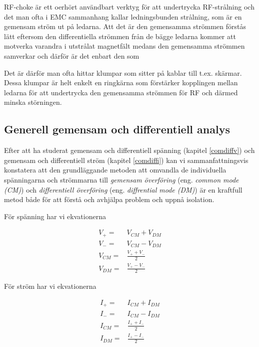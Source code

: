RF-choke är ett oerhört användbart verktyg för att undertrycka RF-strålning
och det man ofta i EMC sammanhang kallar ledningsbunden strålning, som är en
gemensam ström ut på ledarna. Att det är den gemensamma strömmen förstås lätt
eftersom den differentiella strömmen från de bägge ledarna kommer att motverka
varandra i utstrålat magnetfält medans den gemensamma strömmen samverkar och
därför är det enbart den som 

Det är därför man ofta hittar klumpar som sitter
på kablar till t.ex. skärmar. Dessa klumpar är helt enkelt en ringkärna som
förstärker kopplingen mellan ledarna för att undertrycka den gemensamma strömmen
för RF och därmed minska störningen.

\subsection{Generell gemensam och differentiell analys}
\label{comdiffgeneric}

Efter att ha studerat gemensam och differentiell spänning (kapitel \ref{comdiffv})
och gemensam och differentiell ström (kapitel \ref{comdiffi}) kan vi
sammanfattningsvis konstatera att den grundläggande metoden att omvandla
de individuella spänningarna och strömmarna till \emph{gemensam överföring}
(eng. \emph{common mode (CM)}) och \emph{differentiell överföring}
(eng. \emph{diffrential mode (DM)}) är en kraftfull metod både för att
förstå och avhjälpa problem och uppnå isolation.

För spänning har vi ekvationerna

\begin{eqnarray}
V_+ = & V_{CM} + V_{DM}\\
V_- = & V_{CM} - V_{DM}\\
V_{CM} = & \frac{V_+ + V_-}{2}\\
V_{DM} = & \frac{V_+ - V_-}{2}
\end{eqnarray}

För ström har vi ekvationerna

\begin{eqnarray}
I_+ = & I_{CM} + I_{DM}\\
I_- = & I_{CM} - I_{DM}\\
I_{CM} = & \frac{I_+ + I_-}{2}\\
I_{DM} = & \frac{I_+ - I_-}{2}
\end{eqnarray}


